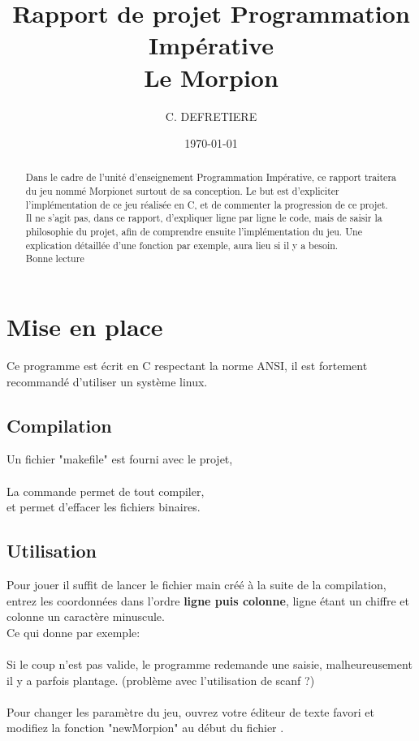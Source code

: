 \documentclass[a4paper, 11pt]{article}
\title{Rapport de projet \og Programmation Impérative\fg \\ Le Morpion}
\author{C. DEFRETIERE}
\date{\today}
\begin{document}
\maketitle

\begin{abstract}
  Dans le cadre de l'unité d'enseignement \og Programmation Impérative\fg , ce rapport traitera du jeu nommé \og Morpion\fg et surtout de sa conception. Le but est d'expliciter l'implémentation de ce jeu réalisée en C, et de commenter la progression de ce projet. Il ne s'agit pas, dans ce rapport, d'expliquer ligne par ligne le code, mais de saisir la philosophie du projet, afin de comprendre ensuite l'implémentation du jeu. Une explication détaillée d'une fonction par exemple, aura lieu si il y a besoin.
\\

Bonne lecture
\end{abstract}

\newpage

\tableofcontents

\newpage

\section{Mise en place}

Ce programme est écrit en C respectant la norme ANSI, il est fortement recommandé d'utiliser un système linux.

\subsection{Compilation}
Un fichier "makefile" est fourni avec le projet,
\\ \\
La commande  permet de tout compiler,\\
et  permet d'effacer les fichiers binaires.

\subsection{Utilisation}

Pour jouer il suffit de lancer le fichier main créé à la suite de la compilation,
entrez les coordonnées dans l'ordre \textbf{ligne puis colonne}, ligne étant un chiffre et colonne un caractère minuscule.\\
Ce qui donne par exemple:  \\
\\
Si le coup n'est pas valide, le programme redemande une saisie, malheureusement il y a parfois plantage. (problème avec l'utilisation de scanf ?)\\
\\
Pour changer les paramètre du jeu, ouvrez votre éditeur de texte favori et modifiez la fonction "newMorpion" au début du fichier .
\end{document}
